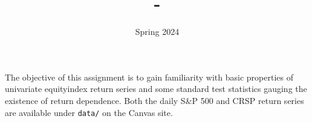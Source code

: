 \documentclass[12pt,twoside]{article}
\title{\course-\assignment}
\author{}
\date{Spring 2024}
\begin{document}
\maketitle

The objective of this assignment is to gain familiarity with basic properties of univariate equityindex return series and some standard test statistics gauging the existence of return dependence. Both the daily S\&P 500 and CRSP return series are available under \texttt{data/} on the Canvas site.

\problem

\clearpage 

\problem

\clearpage

\problem

\clearpage

\problem

\clearpage

\problem

\clearpage

\problem

\clearpage

\problem 

\clearpage

\problem

\clearpage



\end{document}
